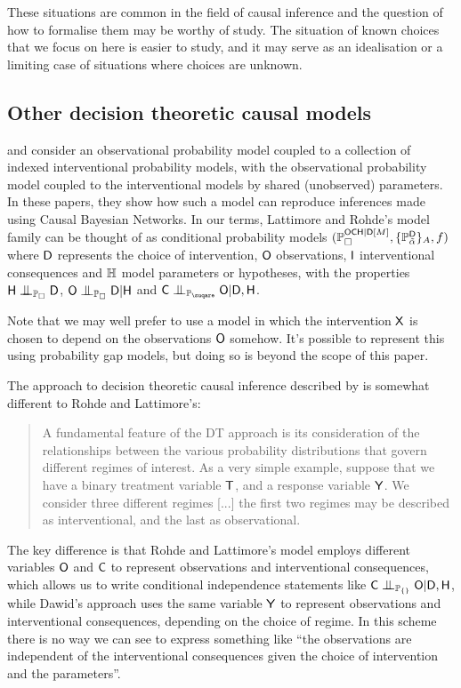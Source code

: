 These situations are common in the field of causal inference and the question of how to formalise them may be worthy of study. The situation of known choices that we focus on here is easier to study, and it may serve as an idealisation or a limiting case of situations where choices are unknown.

\subsection{Other decision theoretic causal models}

\citet{lattimore_causal_2019} and \citet{lattimore_replacing_2019} consider an observational probability model coupled to a collection of indexed interventional probability models, with the observational probability model coupled to the interventional models by shared (unobserved) parameters. In these papers, they show how such a model can reproduce inferences made using Causal Bayesian Networks. In our terms, Lattimore and Rohde's model family can be thought of as conditional probability models $(\mathbb{P}_\square^{\mathsf{OCH}|\mathsf{D}[M]},\{\mathbb{P}_{\tilde{\alpha}}^{\mathsf{D}}\}_A,f)$ where $\mathsf{D}$ represents the choice of intervention, $\mathsf{O}$ observations, $\mathsf{I}$ interventional consequences and $\mathbb{H}$ model parameters or hypotheses, with the properties $\RV{H}\CI_{\prob{P}_{\square}} \RV{D}$, $\RV{O}\CI_{\prob{P}_{\square}} \RV{D}|\RV{H}$ and $\RV{C}\CI_{\prob{P}_{\suqare}} \RV{O}|\RV{D},\RV{H}$.

Note that we may well prefer to use a model in which the intervention $\mathsf{X}$ is chosen to depend on the observations $\mathsf{O}$ somehow. It's possible to represent this using probability gap models, but doing so is beyond the scope of this paper.

The approach to decision theoretic causal inference described by \citet{dawid_decision-theoretic_2020} is somewhat different to Rohde and Lattimore's:

\begin{quote}
A fundamental feature of the DT approach is its consideration of the relationships between the various probability distributions that govern different regimes of interest. As a very simple example, suppose that we have a binary treatment variable $\mathsf{T}$, and a response variable $\mathsf{Y}$. We consider three different regimes [...] the first two regimes may be described as interventional, and the last as observational.
\end{quote}

The key difference is that Rohde and Lattimore's model employs different variables $\mathsf{O}$ and $\mathsf{C}$ to represent observations and interventional consequences, which allows us to write conditional independence statements like $\RV{C}\CI_{\prob{P}_{\{\}}} \RV{O}|\RV{D},\RV{H}$, while Dawid's approach uses the same variable $\mathsf{Y}$ to represent observations and interventional consequences, depending on the choice of regime. In this scheme there is no way we can see to express something like ``the observations are independent of the interventional consequences given the choice of intervention and the parameters''. 

